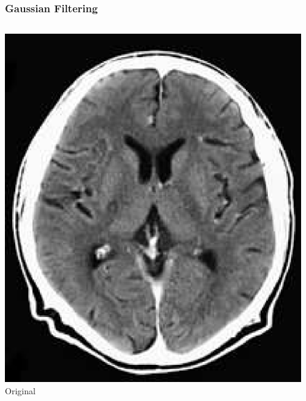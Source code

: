 \begin{frame}
    \frametitle{Gaussian Filtering}
    \begin{columns}[onlytextwidth]
        \begin{column}{0.5\textwidth}\centering
            \centering{}
            \includegraphics[height=0.8\textheight]{img/brain}\\Original
        \end{column}%
        \begin{column}{0.5\textwidth}\centering
            \centering{}

\end{column}
\end{columns}
\end{frame}
